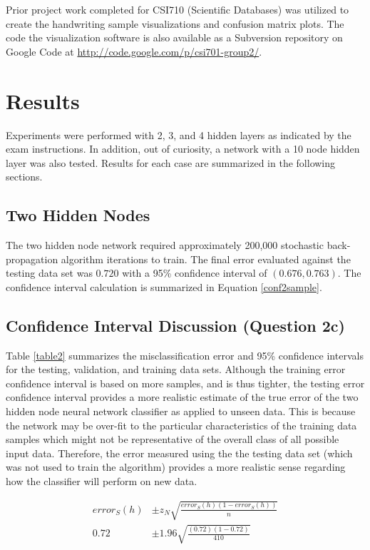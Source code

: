 \documentclass{article}
\begin{document}
Prior project work completed for CSI710 (Scientific Databases) was utilized to create the handwriting sample visualizations and confusion matrix plots. The code the visualization software is also available as a Subversion repository on Google Code at \url{http://code.google.com/p/csi701-group2/}.

\section{Results}\label{Results}

Experiments were performed with 2, 3, and 4 hidden layers as indicated by the exam instructions. In addition, out of curiosity, a network with a 10 node hidden layer was also tested. Results for each case are summarized in the following sections.

\subsection{Two Hidden Nodes}\label{hidden2}

The two hidden node network required approximately 200,000 stochastic back-propagation algorithm iterations to train. The final error evaluated against the testing data set was \(0.720\) with a 95\% confidence interval of \((0.676 , 0.763)\). The confidence interval calculation is summarized in Equation \ref{conf2sample}.

\subsection{Confidence Interval Discussion (Question 2c)}\label{conf2}

Table \ref{table2} summarizes the misclassification error and 95\% confidence intervals for the testing, validation, and training data sets. Although the training error confidence interval is based on more samples, and is thus tighter, the testing error confidence interval provides a more realistic estimate of the true error of the two hidden node neural network classifier as applied to unseen data. This is because the network may be over-fit to the particular characteristics of the training data samples which might not be representative of the overall class of all possible input data. Therefore, the error measured using the the testing data set (which was not used to train the algorithm) provides a more realistic sense regarding how the classifier will perform on new data. 

\begin{equation}\label{conf2sample}
\begin{split}
error_{S}(h) &\pm z_{N}\sqrt{\frac{error_{S}(h)(1-error_{S}(h))}{n}} \\
0.72 &\pm 1.96\sqrt{\frac{(0.72)(1-0.72)}{410}} 
\end{split}
\end{equation}
\end{document}
